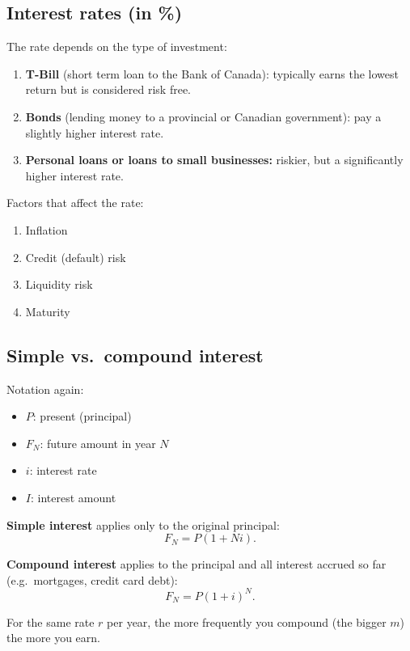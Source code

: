 \documentclass[11pt]{article}
\newcommand{\term}[1]{\textbf{\textcolor{cTerm}{#1}}}
\begin{document}
\subsection*{Interest rates (in \%)}
The rate depends on the type of investment:
\begin{enumerate}[nosep]
  \item \term{T-Bill} (short term loan to the Bank of Canada): typically earns
        the lowest return but is considered risk free.
  \item \term{Bonds} (lending money to a provincial or Canadian government):
        pay a slightly higher interest rate.
  \item \term{Personal loans or loans to small businesses:} riskier, but a
        significantly higher interest rate.
\end{enumerate}

Factors that affect the rate:
\begin{enumerate}[nosep]
  \item Inflation
  \item Credit (default) risk
  \item Liquidity risk
  \item Maturity
\end{enumerate}

\subsection*{Simple vs.\ compound interest}
Notation again:
\begin{itemize}[nosep]
  \item $P$: present (principal)
  \item $F_N$: future amount in year $N$
  \item $i$: interest rate
  \item $I$: interest amount
\end{itemize}

\term{Simple interest} applies only to the original principal:
\[
F_N = P(1 + Ni).
\]

\term{Compound interest} applies to the principal and all interest accrued so
far (e.g.\ mortgages, credit card debt):
\[
F_N = P(1+i)^{N}.
\]

For the same rate $r$ per year, the more frequently you compound (the bigger
$m$) the more you earn.
\end{document}
